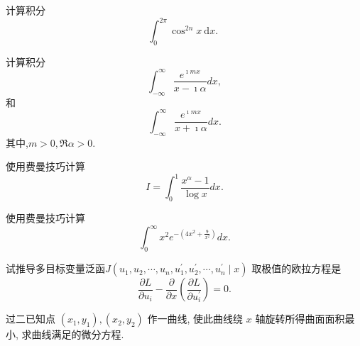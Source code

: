 \documentclass[10pt]{article}
\newenvironment{problem}[2][]{\begin{trivlist}
\item[\hskip \labelsep {\bfseries #1}\hskip \labelsep {\bfseries #2}]}{\end{trivlist}}
\begin{document}
\renewcommand{\labelenumi}{(\arabic{enumi})}
\renewcommand{\labelenumii}{(\arabic{enumi}.\arabic{enumii})}



 




\begin{problem}{5.1}
计算积分
$$
\int_0^{2 \pi} \cos ^{2 n} x \mathrm{~d} x \text {. }
$$
\end{problem}

\begin{problem}{5.2}
  计算积分
  $$
  \int_{-\infty}^{\infty} \frac{e^{\imath m x}}{x-\imath \alpha} d x,
  $$
  和
  $$
  \int_{-\infty}^{\infty} \frac{e^{\imath m x}}{x+\imath \alpha} d x.
  $$
  其中,$m>0, \Re \alpha > 0$.
  \end{problem}
  
\begin{problem}{5.3}
    使用费曼技巧计算
    $$
    I = \int_0^1 \frac{x^\alpha-1}{\log x} d x . 
    $$
  \end{problem}
   
\begin{problem}{5.4}
     使用费曼技巧计算
     $$
     \int_0^{\infty} x^2 e^{-\left(4 x^2+\frac{9}{x^2}\right)} d x .
     $$
\end{problem}

\begin{problem}{5.5}
试推导多目标变量泛函$J\left(u_1, u_2, \cdots, u_n, u_1^{\prime}, u_2^{\prime}, \cdots, u_n^{\prime} \mid x\right)$
取极值的欧拉方程是
$$
\frac{\partial L}{\partial u_i}-\frac{\partial}{\partial x}\left(\frac{\partial L}{\partial u_i^{\prime}}\right)=0 .
$$
\end{problem}


\begin{problem}{5.6}
  过二已知点 $\left(x_1, y_1\right),\left(x_2, y_2\right)$ 作一曲线, 使此曲线绕 $x$ 轴旋转所得曲面面积最小, 求曲线满足的微分方程.
\end{problem}
\end{document}
